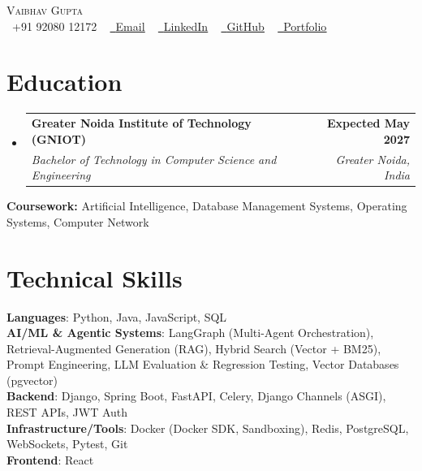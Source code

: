 \documentclass[letterpaper,10pt]{article}
\makeatletter
\newcommand{\resumeSubheading}[4]{
  \vspace{-2pt}\item
    \begin{tabular*}{1.0\textwidth}[t]{l@{\extracolsep{\fill}}r}
      \textbf{#1} & \textbf{\small #2} \\
      \textit{\small#3} & \textit{\small #4} \\
    \end{tabular*}\vspace{-7pt}
}
\newcommand{\resumeSubHeadingListStart}{\begin{itemize}[leftmargin=0.0in, label={}]}
\newcommand{\resumeSubHeadingListEnd}{\end{itemize}}
\makeatother
\begin{document}

\begin{center}
    {\Huge \scshape Vaibhav Gupta} \\ \vspace{1pt}
    \small \raisebox{-0.1\height}\faPhone\ +91 92080 12172 ~
    \href{mailto:vaibhv19.business@gmail.com}{\raisebox{-0.2\height}\faEnvelope\ \underline{Email}} ~
    \href{https://linkedin.com/in/vaibhv19}{\raisebox{-0.2\height}\faLinkedin\ \underline{LinkedIn}} ~
    \href{https://github.com/vaibhv19}{\raisebox{-0.2\height}\faGithub\ \underline{GitHub}} ~
    \href{https://vaibhv19.dev}{\raisebox{-0.2\height}\faGlobe\ \underline{Portfolio}}
    \vspace{-8pt}
\end{center}

\section{Education}
  \resumeSubHeadingListStart
    \resumeSubheading
      {Greater Noida Institute of Technology (GNIOT)}{Expected May 2027}
      {Bachelor of Technology in Computer Science and Engineering}{Greater Noida, India}
  \resumeSubHeadingListEnd
  \vspace{-4pt}
  \begin{itemize}[leftmargin=0in, label={}]
    \small{\item{\textbf{Coursework:} Artificial Intelligence, Database Management Systems, Operating Systems, Computer Network}}
    \vspace{-10pt}
\end{itemize}

\section{Technical Skills}
 \begin{itemize}[leftmargin=0in, label={}]
    \small{\item{
     \textbf{Languages}{: Python, Java, JavaScript, SQL} \\
     \textbf{AI/ML \& Agentic Systems}{: LangGraph (Multi-Agent Orchestration), Retrieval-Augmented Generation (RAG), Hybrid Search (Vector + BM25), Prompt Engineering, LLM Evaluation \& Regression Testing, Vector Databases (pgvector)} \\
     \textbf{Backend}{: Django, Spring Boot, FastAPI, Celery, Django Channels (ASGI), REST APIs, JWT Auth} \\
     \textbf{Infrastructure/Tools}{: Docker (Docker SDK, Sandboxing), Redis, PostgreSQL, WebSockets, Pytest, Git} \\
     \textbf{Frontend}{: React} \\
    }}
 \end{itemize}
 \vspace{-12pt}
\end{document}
